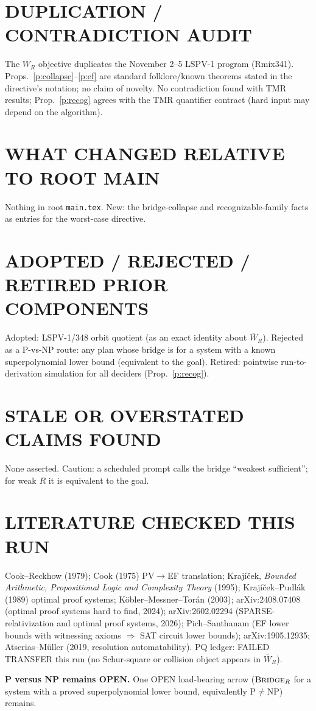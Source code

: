 \documentclass[11pt]{article}
\theoremstyle{definition}\newtheorem{definition}[theorem]{Definition}
\theoremstyle{remark}\newtheorem{remark}[theorem]{Remark}
\begin{document}
\section*{DUPLICATION / CONTRADICTION AUDIT}
The $\overline W_R$ objective duplicates the November 2--5 LSPV-1 program (Rmix341). Props.~\ref{p:collapse}--\ref{p:ef} are
standard folklore/known theorems stated in the directive's notation; no claim of novelty. No contradiction found with TMR results;
Prop.~\ref{p:recog} agrees with the TMR quantifier contract (hard input may depend on the algorithm).
\section*{WHAT CHANGED RELATIVE TO ROOT MAIN}
Nothing in root \texttt{main.tex}. New: the bridge-collapse and recognizable-family facts as entries for the worst-case directive.
\section*{ADOPTED / REJECTED / RETIRED PRIOR COMPONENTS}
Adopted: LSPV-1/348 orbit quotient (as an exact identity about $\overline W_R$). Rejected as a P-vs-NP route: any plan whose bridge is
for a system with a known superpolynomial lower bound (equivalent to the goal). Retired: pointwise run-to-derivation simulation for all
deciders (Prop.~\ref{p:recog}).
\section*{STALE OR OVERSTATED CLAIMS FOUND}
None asserted. Caution: a scheduled prompt calls the bridge ``weakest sufficient''; for weak $R$ it is equivalent to the goal.
\section*{LITERATURE CHECKED THIS RUN}
Cook--Reckhow (1979); Cook (1975) PV$\to$EF translation; Kraj\'i\v{c}ek, \emph{Bounded Arithmetic, Propositional Logic and Complexity
Theory} (1995); Kraj\'i\v{c}ek--Pudl\'ak (1989) optimal proof systems; K\"obler--Messner--Tor\'an (2003); arXiv:2408.07408 (optimal proof
systems hard to find, 2024); arXiv:2602.02294 (SPARSE-relativization and optimal proof systems, 2026); Pich--Santhanam (EF lower bounds
with witnessing axioms $\Rightarrow$ SAT circuit lower bounds); arXiv:1905.12935; Atserias--M\"uller (2019, resolution automatability).
PQ ledger: FAILED TRANSFER this run (no Schur-square or collision object appears in $\overline W_R$).

\medskip\noindent\textbf{P versus NP remains OPEN.} One OPEN load-bearing arrow ($\textsc{Bridge}_R$ for a system with a proved
superpolynomial lower bound, equivalently $\mathrm{P}\ne\mathrm{NP}$) remains.
\end{document}
